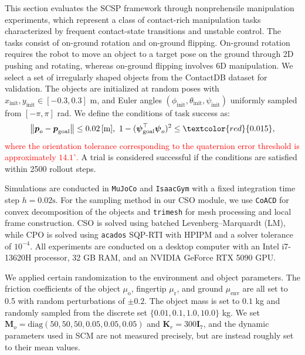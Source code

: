 This section evaluates the SCSP framework through nonprehensile manipulation experiments, which represent a class of contact-rich manipulation tasks characterized by frequent contact-state transitions and unstable control. The tasks consist of on-ground rotation and on-ground flipping. On-ground rotation requires the robot to move an object to a target pose on the ground through 2D pushing and rotating, whereas on-ground flipping involves 6D manipulation. We select a set of irregularly shaped objects from the ContactDB dataset \cite{brahmbhatt2019contactdb} for validation. The objects are initialized at random poses with 
$x_{\text{init}}, y_{\text{init}} \in [-0.3, 0.3]$ m, 
and Euler angles $(\phi_{\text{init}}, \theta_{\text{init}} , \psi_{\text{init}})$ 
uniformly sampled from $[-\pi, \pi]$ rad. We define the conditions of task success as: 
\begin{equation}
    \left\| \boldsymbol{p}_o - \boldsymbol{p}_{\text{goal}} \right\|
\le 0.02 \,\text{[m]}, \ 
1 - (\boldsymbol{\psi}_{\text{goal}}^\top \boldsymbol{\psi}_o)^2
\le \textcolor{red}{0.015}, \label{eq:pose_success}
\end{equation}
\textcolor{red}{where the orientation tolerance corresponding to the quaternion error threshold is approximately $14.1^\circ$.} A trial is considered successful if the conditions are satisfied within 2500 rollout steps.

Simulations are conducted in \texttt{MuJoCo} \cite{todorov2012mujoco} and  \texttt{IsaacGym} \cite{makoviychuk2021isaac} with a fixed integration time step $h=0.02 \text{s}$. For the sampling method in our CSO module, we use \texttt{CoACD} \cite{wei2022approximate} for convex decomposition of the objects and \texttt{trimesh} for mesh processing and local frame construction. CSO is solved using batched Levenberg--Marquardt (LM), while CPO is solved using \texttt{acados} SQP-RTI with HPIPM and a solver tolerance of $10^{-4}$. All experiments are conducted on a desktop computer with an Intel i7-13620H processor, 32 GB RAM, and an NVIDIA GeForce RTX 5090 GPU.

We applied certain randomization to the environment and object parameters. The friction coefficients of the object $\mu_{\text{o}}$, fingertip $\mu_{\text{r}}$, and ground $\mu_{\text{env}}$ are all set to 0.5 with random perturbations of $\pm 0.2$. The object mass is set to $0.1$ kg and randomly sampled from the discrete set
$\{0.01,0.1,1.0,10.0\}$ kg. We set $\boldsymbol{M}_o=\text{diag}(50,50,50,0.05,0.05,0.05)$ and $\boldsymbol{K}_r=300 \boldsymbol{I}_7$, and the dynamic parameters used in SCM are not measured precisely, but are instead roughly set to their mean values.

